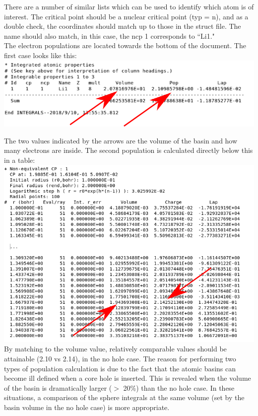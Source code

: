 \documentclass[12pt]{article}
\begin{document}
There are a number of similar lists which can be used to identify which atom is of interest.  The critical point should be a nuclear critical point (typ = n), and as a double check, the coordinates should match up to those in the struct file.  The name should also match, in this case, the ncp 1 corresponds to ``Li1."\\

The electron populations are located towards the bottom of the document.  The first case looks like this: \\

\includegraphics[scale=0.5]{./images/integrals.png}

The two values indicated by the arrows are the volume of the basin and how many electrons are inside. The second population is calculated directly below this in a table: \\

\includegraphics[scale=0.4]{./images/spheres.png}\\ 

By matching to the volume value, relatively comparable values should be attainable (2.10 vs 2.14), in the no hole case.  The reason for performing two types of population calculation is due to the fact that the atomic basins can become ill defined when a core hole is inserted.  This is revealed when the volume of the basin is dramatically larger ($>$ 20\%) than the no hole case.  In these situations, a comparison of the sphere integrals at the same volume (set by the basin volume in the no hole case) is more appropriate.  \\
\end{document}
